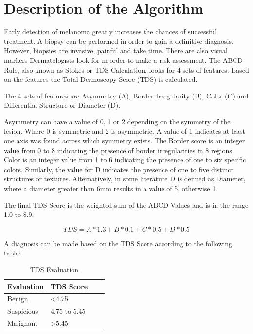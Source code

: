 \section{Description of the Algorithm}

Early detection of melanoma greatly increases the chances of successful treatment. A biopsy can be performed in order to gain a definitive diagnosis. However, biopsies are invasive, painful and take time. There are also visual markers Dermatologists look for in order to make a risk assessment. The ABCD Rule, also known as Stokes or TDS Calculation, looks for 4 sets of features. Based on the features the Total Dermoscopy Score (TDS) is calculated.

The 4 sets of features are Asymmetry (A), Border Irregularity (B), Color (C) and Differential Structure or Diameter (D).

Asymmetry can have a value of 0, 1 or 2 depending on the symmetry of the lesion. Where 0 is symmetric and 2 is asymmetric. A value of 1 indicates at least one axis was found across which symmetry exists. The Border score is an integer value from 0 to 8 indicating the presence of border irregularities in 8 regions. Color is an integer value from 1 to 6 indicating the presence of one to six specific colors. Similarly, the value for D indicates the presence of one to five distinct structures or textures. Alternatively, in some literature\cite{Siddiq_2015} D is defined as Diameter, where a diameter greater than 6mm results in a value of 5, otherwise 1.

The final TDS Score is the weighted sum of the ABCD Values and is in the range 1.0 to 8.9.

\begin{equation}
TDS = A * 1.3 + B * 0.1 + C * 0.5 + D * 0.5
\end{equation}

A diagnosis can be made based on the TDS Score according to the following table:

\begin{table}[H]
\centering
\small
    \begin{tabular}{ | l | p{3.5cm} | l | p{3.5cm} |}
    \hline
    Evaluation & TDS Score \\ \hline
    Benign & \textless  4.75  \\ \hline
    Suspicious & 4.75 to 5.45  \\ \hline
    Malignant & \textgreater  5.45  \\ \hline

    \end{tabular}

    \caption{TDS Evaluation\cite{Weigert_2012}}
    \label{fig:tds_eval}

\end{table}



